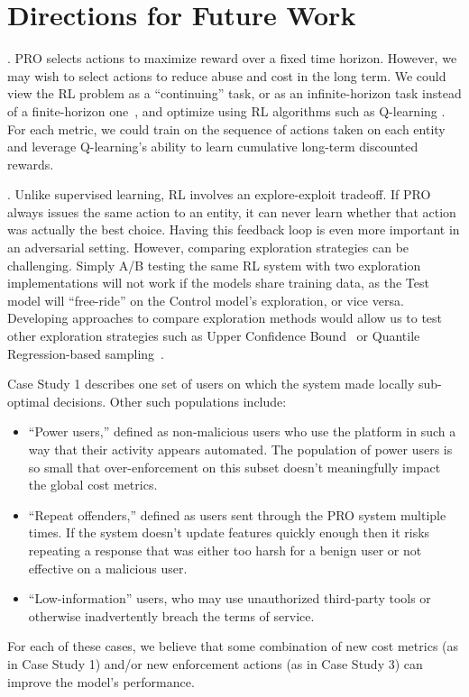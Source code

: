 \section{Directions for Future Work}
\label{sec:conclusion}

. PRO selects actions to maximize reward over a fixed time horizon. However, we may wish to select actions to reduce abuse and cost in the long term. We could view the RL problem as a ``continuing'' task, or as an infinite-horizon task instead of a finite-horizon one~\cite{sutton2018reinforcement}, and optimize using RL algorithms such as Q-learning \cite{watkins1992q,mnih2015human,kalweit2020deep}. For each metric, we could train on the sequence of actions taken on each entity and leverage Q-learning's ability to learn cumulative long-term discounted rewards.

. Unlike supervised learning, RL involves an explore-exploit tradeoff. If PRO always issues the same action to an entity, it can never learn whether that action was actually the best choice. Having this feedback loop is even more important in an adversarial setting. However, comparing exploration strategies can be challenging. Simply A/B testing the same RL system with two exploration implementations will not work if the models share training data, as the Test model will ``free-ride'' on the Control model's exploration, or vice versa. Developing approaches to compare exploration methods would allow us to test other exploration strategies such as Upper Confidence Bound~\cite{carpentier2011upper} or Quantile Regression-based sampling~\cite{quantileregression}.

 Case Study 1 describes one set of users on which the system made locally sub-optimal decisions. Other such populations include:
\begin{itemize}
    \squeezelist
    \item ``Power users,'' defined as non-malicious users who use the platform in such a way that their activity appears automated. The population of power users is so small that over-enforcement on this subset doesn't meaningfully impact the global cost metrics.
    \item ``Repeat offenders,'' defined as users sent through the PRO system multiple times. If the system doesn't update features quickly enough then it risks repeating a response that was either too harsh for a benign user or not effective on a malicious user.
    \item ``Low-information'' users, who may use unauthorized third-party tools or otherwise inadvertently breach the \osn terms of service.
\end{itemize}
For each of these cases, we believe that some combination of new cost metrics (as in Case Study 1) and/or new enforcement actions (as in Case Study 3) can improve the model's performance.

